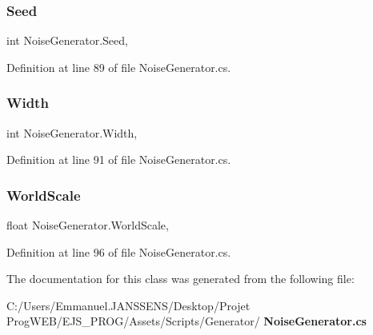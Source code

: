 \mbox{\label{class_noise_generator_ac65b1370bc60f2cb64bf6b064418b96f}} 
\subsubsection{Seed}
{\footnotesize\ttfamily int Noise\+Generator.\+Seed\hspace{0.3cm}{\ttfamily [get]}, {\ttfamily [set]}}



Definition at line 89 of file Noise\+Generator.\+cs.

\mbox{\label{class_noise_generator_a1315cad3607e2f9cf5d2968c6dae0e28}} 
\subsubsection{Width}
{\footnotesize\ttfamily int Noise\+Generator.\+Width\hspace{0.3cm}{\ttfamily [get]}, {\ttfamily [set]}}



Definition at line 91 of file Noise\+Generator.\+cs.

\mbox{\label{class_noise_generator_a37552851974d43296ad5eb95d3175e5b}} 
\subsubsection{World\+Scale}
{\footnotesize\ttfamily float Noise\+Generator.\+World\+Scale\hspace{0.3cm}{\ttfamily [get]}, {\ttfamily [set]}}



Definition at line 96 of file Noise\+Generator.\+cs.



The documentation for this class was generated from the following file\+:\begin{DoxyCompactItemize}
\item 
C\+:/\+Users/\+Emmanuel.\+J\+A\+N\+S\+S\+E\+N\+S/\+Desktop/\+Projet Prog\+W\+E\+B/\+E\+J\+S\+\_\+\+P\+R\+O\+G/\+Assets/\+Scripts/\+Generator/\textbf{ Noise\+Generator.\+cs}\end{DoxyCompactItemize}
